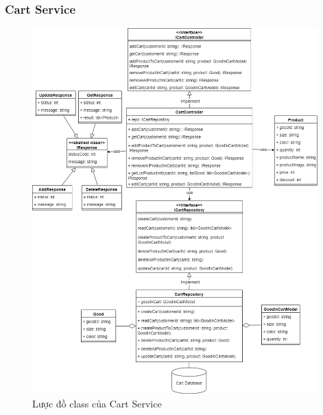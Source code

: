 \subsubsection{Cart Service}
\begin{figure}[!htp]
	\centering
	\includegraphics[width=11cm]{img/Architecture/service/CartService.png}
	\newline
	\caption{Lược đồ class của Cart Service}
\end{figure}


